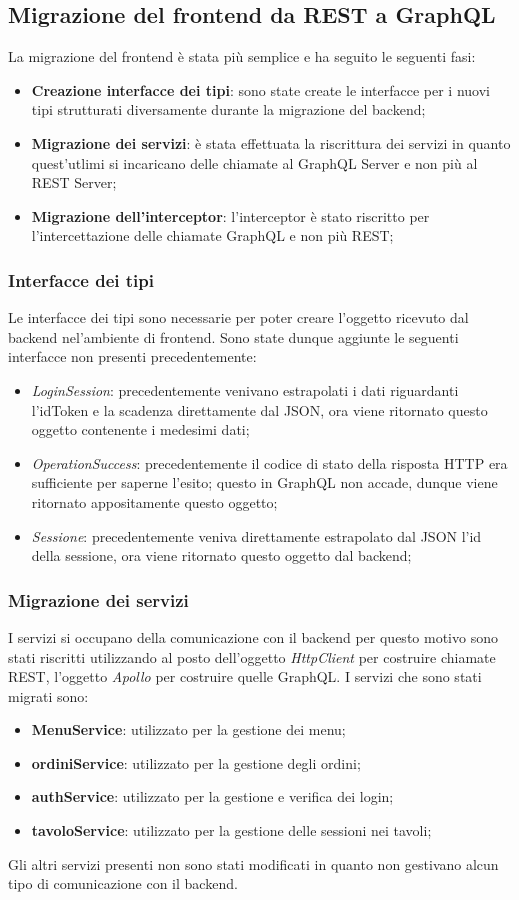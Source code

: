 \subsection{Migrazione del frontend da REST a GraphQL}
La migrazione del frontend è stata più semplice e ha seguito le seguenti fasi:
\begin{itemize}
  \item \textbf{Creazione interfacce dei tipi}: sono state create le interfacce per i nuovi tipi strutturati diversamente durante la migrazione del backend;
  \item \textbf{Migrazione dei servizi}: è stata effettuata la riscrittura dei servizi in quanto quest'utlimi si incaricano delle chiamate al GraphQL Server e non più al REST Server;
  \item \textbf{Migrazione dell'interceptor}: l'interceptor è stato riscritto per l'intercettazione delle chiamate GraphQL e non più REST;
\end{itemize}
\subsubsection*{Interfacce dei tipi}
Le interfacce dei tipi sono necessarie per poter creare l'oggetto ricevuto dal backend nel'ambiente di frontend. Sono state dunque aggiunte le seguenti interfacce non presenti precedentemente:
\begin{itemize}
  \item \textit{LoginSession}: precedentemente venivano estrapolati i dati riguardanti l'idToken e la scadenza direttamente dal JSON, ora viene ritornato questo oggetto contenente i medesimi dati;
  \item \textit{OperationSuccess}: precedentemente il codice di stato della risposta HTTP era sufficiente per saperne l'esito; questo in GraphQL non accade, dunque viene ritornato appositamente questo oggetto;
  \item \textit{Sessione}: precedentemente veniva direttamente estrapolato dal JSON l'id della sessione, ora viene ritornato questo oggetto dal backend;
\end{itemize}
\subsubsection{Migrazione dei servizi}
I servizi si occupano della comunicazione con il backend per questo motivo sono stati riscritti utilizzando al posto dell'oggetto \textit{HttpClient} per costruire chiamate REST, l'oggetto \textit{Apollo} per costruire quelle GraphQL.
I servizi che sono stati migrati sono:
\begin{itemize}
  \item \textbf{MenuService}: utilizzato per la gestione dei menu;
  \item \textbf{ordiniService}: utilizzato per la gestione degli ordini;
  \item \textbf{authService}: utilizzato per la gestione e verifica dei login;
  \item \textbf{tavoloService}: utilizzato per la gestione delle sessioni nei tavoli;
\end{itemize}
Gli altri servizi presenti non sono stati modificati in quanto non gestivano alcun tipo di comunicazione con il backend.
